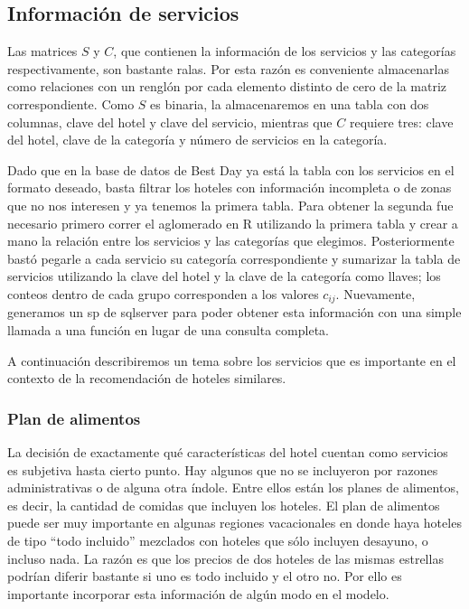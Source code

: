 \documentclass[12pt]{report}
\begin{document}
\subsection*{Información de servicios}

Las matrices $S$ y $C$, que contienen la información de los servicios y las categorías respectivamente, son bastante ralas. Por esta razón es conveniente almacenarlas como relaciones con un renglón por cada elemento distinto de cero de la matriz correspondiente. Como $S$ es binaria, la almacenaremos en una tabla con dos columnas, clave del hotel y clave del servicio, mientras que $C$ requiere tres: clave del hotel, clave de la categoría y número de servicios en la categoría.

Dado que en la base de datos de Best Day ya está la tabla con los servicios en el formato deseado, basta filtrar los hoteles con información incompleta o de zonas que no nos interesen y ya tenemos la primera tabla. Para obtener la segunda fue necesario primero correr el aglomerado en R utilizando la primera tabla y crear a mano la relación entre los servicios y las categorías que elegimos. Posteriormente bastó pegarle a cada servicio su categoría correspondiente y sumarizar la tabla de servicios utilizando la clave del hotel y la clave de la categoría como llaves; los conteos dentro de cada grupo corresponden a los valores $c_{ij}$. Nuevamente, generamos un \gls{sp} de \gls{sqlserver} para poder obtener esta información con una simple llamada a una función en lugar de una consulta completa.

A continuación describiremos un tema sobre los servicios que es importante en el contexto de la recomendación de hoteles similares.

\subsubsection*{Plan de alimentos}

La decisión de exactamente qué características del hotel cuentan como servicios es subjetiva hasta cierto punto. Hay algunos que no se incluyeron por razones administrativas o de alguna otra índole. Entre ellos están los planes de alimentos, es decir, la cantidad de comidas que incluyen los hoteles. El plan de alimentos puede ser muy importante en algunas regiones vacacionales en donde haya hoteles de tipo ``todo incluido'' mezclados con hoteles que sólo incluyen desayuno, o incluso nada. La razón es que los precios de dos hoteles de las mismas estrellas podrían diferir bastante si uno es todo incluido y el otro no. Por ello es importante incorporar esta información de algún modo en el modelo.
\end{document}
